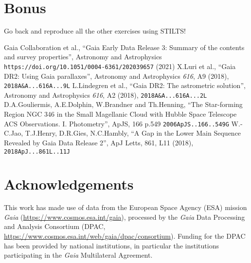 \documentclass{article}
\newcommand{\winfig}[2]  %
           {\vspace*{-0.5cm}
            \hspace*{0.5cm}\mbox{\vtop{\hbox{\includegraphics[#1]
                                                             {figures/#2}}}}}
\begin{document}
% 

\newpage


\section*{Bonus}

Go back and reproduce all the other exercises using STILTS!



\begin{thebibliography}{9}
   Gaia Collaboration et al.,
   ``Gaia Early Data Release 3: Summary of the contents and survey properties'',
   Astronomy and Astrophysics
   {\tt https://doi.org/10.1051/0004-6361/202039657} (2021)
   X.Luri et al.,
   ``Gaia DR2: Using Gaia parallaxes'',
   Astronomy and Astrophysics {\em 616}, A9 (2018),
   {\tt 2018A\&A...616A...9L}
   L.Lindegren et al.,
   ``Gaia DR2: The astrometric solution'',
   Astronomy and Astrophysics {\em 616}, A2 (2018),
   {\tt 2018A\&A...616A...2L}
   D.A.Gouliermis, A.E.Dolphin, W.Brandner and Th.Henning,
   ``The Star-forming Region NGC 346 in the Small Magellanic
     Cloud with Hubble Space Telescope ACS Observations. I. Photometry'',
   ApJS, 166 p.549
   {\tt 2006ApJS..166..549G}
   W.-C.Jao, T.J.Henry, D.R.Gies, N.C.Hambly,
   ``A Gap in the Lower Main Sequence Revealed by Gaia Data Release 2'',
   ApJ Letts, 861, L11 (2018),
   {\tt 2018ApJ...861L..11J}
\end{thebibliography}

\section*{Acknowledgements}

This work has made use of data from the European Space Agency (ESA) mission
{\it Gaia} (\url{https://www.cosmos.esa.int/gaia}), processed by the {\it Gaia}
Data Processing and Analysis Consortium
(DPAC, \url{https://www.cosmos.esa.int/web/gaia/dpac/consortium}).
Funding for the DPAC
has been provided by national institutions, in particular the institutions
participating in the {\it Gaia} Multilateral Agreement.


\label{lastPage}
\end{document}
